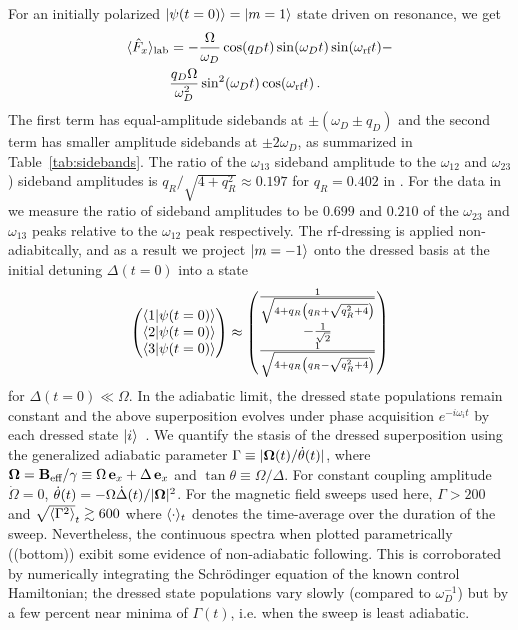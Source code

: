 \documentclass[aps,prl,reprint,superscriptaddress,floatfix]{revtex4-1}
\begin{document}
For an initially polarized $\vert \psi(t=0) \rangle  = \vert m=1 \rangle $ state driven on resonance, we get
    \begin{align*}
        \langle \hat{F}_x \rangle_{\text{lab}} &= -\frac{\Omega}{\omega_D} \cos(q_D t) \sin(\omega_D t) \sin(\omega_{\text{rf}} t) - \\ &\frac{q_D \Omega}{\omega_D^2} \sin^2(\omega_D t) \cos(\omega_{\text{rf}} t) \, .
    \end{align*}
The first term has equal-amplitude sidebands at $\pm(\omega_D \pm q_D)$ and the second term has smaller amplitude sidebands at $\pm 2\omega_D$, as summarized in Table~\ref{tab:sidebands}.
The ratio of the $\omega_{13}$ sideband amplitude to the $\omega_{12}$ and $\omega_{23}$) sideband amplitudes is $q_R/\sqrt{4+q_R^2} \approx 0.197$ for $q_R = 0.402$ in .
For the data in  we measure the ratio of sideband amplitudes to be $0.699$ and $0.210$ of the $\omega_{23}$ and $\omega_{13}$ peaks relative to the $\omega_{12}$ peak respectively.
The rf-dressing is applied non-adiabitcally, and as a result we project $\vert m=-1 \rangle $ onto the dressed basis at the initial detuning $\Delta(t=0)$ into a state
\begin{equation*}
    \begin{pmatrix}
        \langle 1 \vert \psi(t=0) \rangle  \\
        \langle 2 \vert \psi(t=0) \rangle  \\
        \langle 3 \vert \psi(t=0) \rangle  
    \end{pmatrix} \approx 
    \begin{pmatrix}
        \frac{1}{\sqrt{4 + q_R \left(q_R + \sqrt{q_R^2+4}\right)}} \\
        -\frac{1}{\sqrt{2}} \\
        \frac{1}{\sqrt{4 + q_R \left(q_R - \sqrt{q_R^2+4}\right)}}
    \end{pmatrix}
\end{equation*}
for $\Delta(t=0) \ll \Omega$.
In the adiabatic limit, the dressed state populations remain constant and the above superposition evolves under phase acquisition $e^{-i \omega_i t}$ by each dressed state $\vert i \rangle $~\cite{messiah_quantum_1962}. 
We quantify the stasis of the dressed superposition using the generalized adiabatic parameter $\Gamma \equiv \vert \mathbf{\Omega}(t)/\dot{\theta}(t) \vert $, where $\mathbf{\Omega} = \mathbf{B}_{\text{eff}} / \gamma \equiv \Omega \, \mathbf{e}_x + \Delta \, \mathbf{e}_x$ and $\tan \theta \equiv \Omega / \Delta$.
For constant coupling amplitude $\dot{\Omega} = 0$, $\dot{\theta}(t) = -\Omega \dot{\Delta}(t)/\vert \mathbf{\Omega} \vert ^2$.
For the magnetic field sweeps used here, $\Gamma > 200$ and $\sqrt{\langle \Gamma^2 \rangle}_t \gtrsim 600$ where $\langle \cdot \rangle_t$ denotes the time-average over the duration of the sweep.
Nevertheless, the continuous spectra when plotted parametrically ((bottom)) exibit some evidence of non-adiabatic following.
This is corroborated by numerically integrating the Schr\"{o}dinger equation of the known control Hamiltonian; the dressed state populations vary slowly (compared to $\omega_D^{-1}$) but by a few percent near minima of $\Gamma(t)$, i.e. when the sweep is least adiabatic. 
\end{document}
